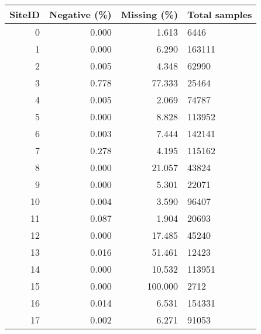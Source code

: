\begin{tabular}{rrrl}
\toprule
 SiteID &  Negative (\%) &  Missing (\%) & Total samples \\
\midrule
      0 &         0.000 &        1.613 &          6446 \\
      1 &         0.000 &        6.290 &        163111 \\
      2 &         0.005 &        4.348 &         62990 \\
      3 &         0.778 &       77.333 &         25464 \\
      4 &         0.005 &        2.069 &         74787 \\
      5 &         0.000 &        8.828 &        113952 \\
      6 &         0.003 &        7.444 &        142141 \\
      7 &         0.278 &        4.195 &        115162 \\
      8 &         0.000 &       21.057 &         43824 \\
      9 &         0.000 &        5.301 &         22071 \\
     10 &         0.004 &        3.590 &         96407 \\
     11 &         0.087 &        1.904 &         20693 \\
     12 &         0.000 &       17.485 &         45240 \\
     13 &         0.016 &       51.461 &         12423 \\
     14 &         0.000 &       10.532 &        113951 \\
     15 &         0.000 &      100.000 &          2712 \\
     16 &         0.014 &        6.531 &        154331 \\
     17 &         0.002 &        6.271 &         91053 \\
\bottomrule
\end{tabular}
